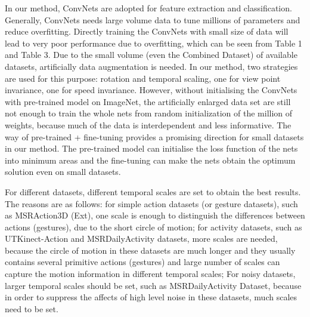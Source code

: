 \documentclass[conference]{IEEEtran}
\begin{document}
In our method, ConvNets are adopted for feature extraction and classification. Generally, ConvNets needs large volume data to tune millions of parameters and reduce overfitting. Directly training the ConvNets with small size of data will lead to very poor performance due to overfitting, which can be seen from Table 1 and Table 3. Due to the small volume (even the Combined Dataset) of available datasets, artificially data augmentation is needed. In our method, two strategies are used for this purpose: rotation and temporal scaling, one for view point invariance, one for speed invariance. However, without initialising the ConvNets with pre-trained model on ImageNet, the artificially enlarged data set are still not enough to train the whole nets from random initialization of the million of weights, because much of the data is interdependent and less informative. The way of pre-trained + fine-tuning provides a promising direction for small datasets in our method. The pre-trained model can initialise the loss function of the nets into minimum areas and the fine-tuning can make the nets obtain the optimum solution even on small datasets.

For different datasets, different temporal scales are set to obtain the best results. The reasons are as follows: for simple action datasets (or gesture datasets), such as MSRAction3D (Ext), one scale is enough to distinguish the differences between actions (gestures), due to the short circle of motion; for activity datasets, such as UTKinect-Action and MSRDailyActivity datasets, more scales are needed, because the circle of motion in these datasets are much longer and they usually contains several primitive actions (gestures) and large number of scales can capture the motion information in different temporal scales; For noisy datasets, larger temporal scales should be set, such as MSRDailyActivity Dataset, because in order to suppress the affects of high level noise in these datasets, much scales need to be set.
\end{document}
